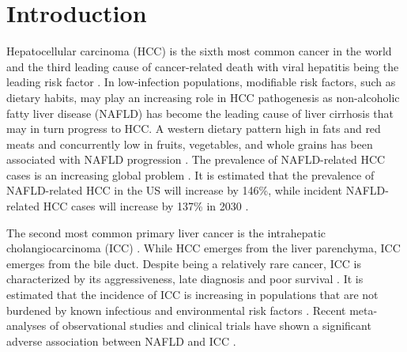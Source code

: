 \documentclass[nutrients,article,submit,moreauthors,pdftex]{Definitions/mdpi}
\begin{document}

\hypertarget{sec1}{%
\section{Introduction}\label{sec1}}

Hepatocellular carcinoma (HCC) is the sixth most common cancer in the
world and the third leading cause of cancer-related death with viral
hepatitis being the leading risk factor \citep{Massarweh2017}. In
low-infection populations, modifiable risk factors, such as dietary
habits, may play an increasing role in HCC pathogenesis as non-alcoholic
fatty liver disease (NAFLD) has become the leading cause of liver
cirrhosis \citep{Younossi2016, Younossi2020} that may in turn progress to
HCC. A western dietary pattern high in fats and red meats and
concurrently low in fruits, vegetables, and whole grains has been
associated with NAFLD progression \citep{Guo2022}. The prevalence of
NAFLD-related HCC cases is an increasing global problem \citep{Younossi2016}.
It is estimated that the prevalence of NAFLD-related HCC in the US will
increase by 146\%, while incident NAFLD-related HCC cases will increase
by 137\% in 2030 \citep{Estes2018}.

The second most common primary liver cancer is the intrahepatic
cholangiocarcinoma (ICC) \citep{Khan2019}. While HCC emerges from the liver
parenchyma, ICC emerges from the bile duct. Despite being a relatively
rare cancer, ICC is characterized by its aggressiveness, late diagnosis
and poor survival \citep{kirstein2016}. It is estimated that the incidence of
ICC is increasing in populations that are not burdened by known
infectious and environmental risk factors \citep{Bergquist2015}. Recent
meta-analyses of observational studies and clinical trials have shown a
significant adverse association between NAFLD and ICC
\citep{Wongjarupong2017, corrao2020}.
\end{document}
